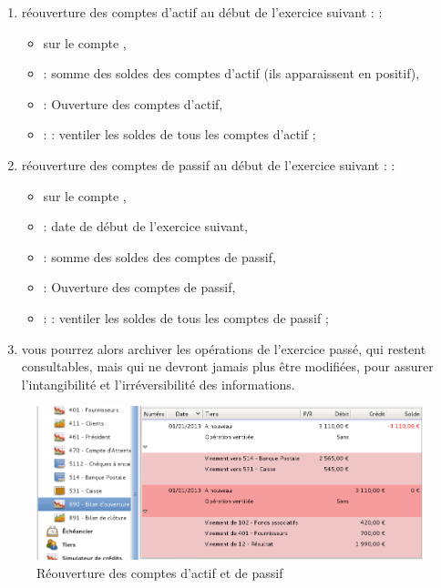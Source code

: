 \begin{enumerate}
	\item réouverture des comptes d'actif au début de l'exercice suivant \ifIllustration {} :
	\else :
	\fi
		\begin{itemize}
			\item sur le compte ,
			\item {} : somme des soldes des comptes d'actif (ils apparaissent en positif),
			\item {} : Ouverture des comptes d'actif,
			\item {} :  : ventiler les soldes de tous les comptes d'actif ;
		\end{itemize}		
	\item réouverture des comptes de passif au début de l'exercice suivant \ifIllustration {} :
	\else :
	\fi
		\begin{itemize}
			\item sur le compte ,
			\item {} : date de début de l'exercice suivant,
			\item {} : somme des soldes des comptes de passif,
			\item {} : Ouverture des comptes de passif,
			\item {} :  : ventiler les soldes de tous les comptes de passif ;
		\end{itemize}
	\item vous pourrez alors archiver les opérations de l'exercice passé, qui restent consultables, mais qui ne devront jamais plus être modifiées, pour assurer l'intangibilité et l'irréversibilité des informations.
\end{enumerate}		

		\ifIllustration
		\begin{figure}[!ht]
		\begin{center}
		\includegraphics[scale=0.5]{image/screenshot/asso_accounts_reopening}
		\end{center}
		\caption{Réouverture des comptes d'actif et de passif}
		\label{asso-accounts-reopening-img}
		\end{figure}
		\fi

